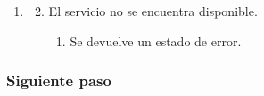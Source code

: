 \begin{description}
   \begin{enumerate} \itemsep1pt \parskip0pt 
   \setcounter{enumi}{3}
   \renewcommand{\labelenumi}{}
   \renewcommand{\labelenumiii}{\arabic{enumiii}.}
   \renewcommand{\labelenumii}{\arabic{enumi}\alph{enumii}.}
      \item 
      \begin {enumerate}
         \setcounter{enumii}{1}
         \item El servicio no se encuentra disponible.
         \begin{enumerate}
         \item Se devuelve un estado de error.
         \end{enumerate}
      \end{enumerate}
   \end{enumerate}
\end{description}


\subsubsection{Siguiente paso} 

